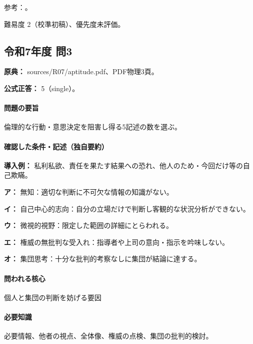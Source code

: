 \par 参考：\cite{davis_seven_steps}。

\par 難易度 2（校準初稿）、優先度未評価。

\subsection{令和7年度 問3}
\label{q:r07-reg-apt-03}

\noindent\textbf{原典：} sources/R07/aptitude.pdf、PDF物理3頁。

\textbf{公式正答：} 5（single）。

\paragraph{問題の要旨} 倫理的な行動・意思決定を阻害し得る5記述の数を選ぶ。

\paragraph{確認した条件・記述（独自要約）}\mbox{}\par

\noindent\textbf{導入例：} 私利私欲、責任を果たす結果への恐れ、他人のため・今回だけ等の自己欺瞞。\par

\noindent\textbf{ア：} 無知：適切な判断に不可欠な情報の知識がない。\par

\noindent\textbf{イ：} 自己中心的志向：自分の立場だけで判断し客観的な状況分析ができない。\par

\noindent\textbf{ウ：} 微視的視野：限定した範囲の詳細にとらわれる。\par

\noindent\textbf{エ：} 権威の無批判な受入れ：指導者や上司の意向・指示を吟味しない。\par

\noindent\textbf{オ：} 集団思考：十分な批判的考察なしに集団が結論に達する。\par

\paragraph{問われる核心} 個人と集団の判断を妨げる要因

\paragraph{必要知識} 必要情報、他者の視点、全体像、権威の点検、集団の批判的検討。

